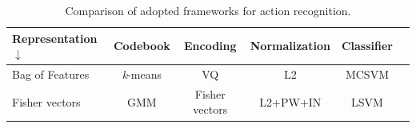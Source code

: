 \begin{table}[h!]
\caption{Comparison of adopted frameworks for action recognition.}
\begin{center}
{
\begin{tabular}{ l| c c c c c }
\hline
Representation $\downarrow$ & Codebook & Encoding & Normalization & Classifier \\
\hline
Bag of Features & \textit{k}-means & VQ & L2 & MCSVM \\
Fisher vectors & GMM & Fisher vectors & L2+PW+IN & LSVM \\
\hline
\end{tabular}
}
\end{center}
\label{tab:frameworks}
\end{table}

